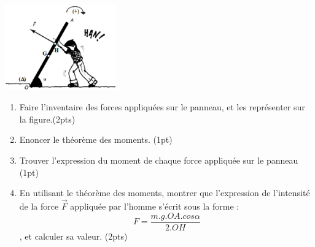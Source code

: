 \documentclass[12pt]{article}
\begin{document}
\begin{center}

    \includegraphics[width=0.36\textwidth]{./img/rotation.png}
\end{center}
\begin{enumerate}
    \item Faire l’inventaire des forces appliquées sur le panneau, et les
        représenter sur la figure.\dotfill(2pts)
    \item Enoncer le théorème des moments. \dotfill(1pt)
\item Trouver l’expression du moment de chaque force appliquée
    sur le panneau \dotfill(1pt)
\item En utilisant le théorème des moments, montrer que l’expression de l’intensité de la force $\vec{F}$ appliquée par l’homme s'écrit sous la forme :$$F = \frac{m.g.OA.cos\alpha}{2.OH}$$
    , et calculer sa valeur. \dotfill(2pts)
        \end{enumerate}
\end{document}
